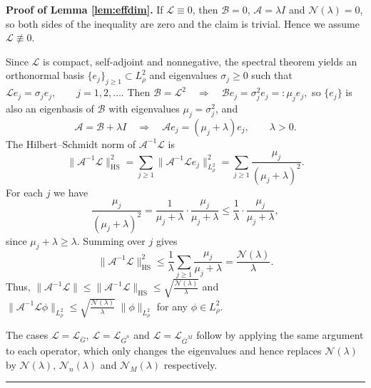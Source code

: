 \documentclass[12pt]{article}
\def\Gbar{ {\overline{G}} }
\newenvironment{proof}[1][Proof]{\noindent\textbf{#1.} }{\ \rule{0.5em}{0.5em}}
\numberwithin{equation}{section}
\numberwithin{theorem}{section}
\begin{document}
\begin{proof}[Proof of Lemma \ref{lem:effdim}]
If $\mathcal{L}\equiv 0$, then $\mathcal{B}=0$, $\mathcal{A}=\lambda I$ and $\mathcal{N}(\lambda)=0$, so both sides of the inequality are zero and the claim is trivial. Hence we assume $\mathcal{L}\not\equiv 0$.

Since $\mathcal{L}$ is compact, self-adjoint and nonnegative, the spectral theorem yields an orthonormal basis $\{e_j\}_{j\ge1}\subset L_\rho^2$ and eigenvalues $\sigma_j\ge0$ such that
$
\mathcal{L} e_j = \sigma_j e_j,\qquad j=1,2,\dots$. 
Then
$ 
\mathcal{B}=\mathcal{L}^2 \quad\Rightarrow\quad \mathcal{B}e_j=\sigma_j^2 e_j =:\mu_j e_j,
$
so $\{e_j\}$ is also an eigenbasis of $\mathcal{B}$ with eigenvalues $\mu_j=\sigma_j^2$, and
$$
\mathcal{A}=\mathcal{B}+\lambda I \quad\Rightarrow\quad \mathcal{A}e_j=(\mu_j+\lambda)e_j,\qquad \lambda>0.
$$
The Hilbert--Schmidt norm of $\mathcal{A}^{-1}\mathcal{L}$ is
$$
\|\mathcal{A}^{-1}\mathcal{L}\|_{\mathrm{HS}}^2
= \sum_{j\ge1}\|\mathcal{A}^{-1}\mathcal{L}e_j\|_{L_\rho^2}^2
= \sum_{j\ge1}\frac{\mu_j}{(\mu_j+\lambda)^2}.
$$
For each $j$ we have 
$$
\frac{\mu_j}{(\mu_j+\lambda)^2}
= \frac{1}{\mu_j+\lambda}\cdot\frac{\mu_j}{\mu_j+\lambda}
\le \frac{1}{\lambda}\cdot\frac{\mu_j}{\mu_j+\lambda},
$$
since $\mu_j+\lambda\ge\lambda$. Summing over $j$ gives
$$
\|\mathcal{A}^{-1}\mathcal{L}\|_{\mathrm{HS}}^2
\le \frac{1}{\lambda}\sum_{j\ge1}\frac{\mu_j}{\mu_j+\lambda}
= \frac{\mathcal{N}(\lambda)}{\lambda}.
$$
Thus, 
$
\|\mathcal{A}^{-1}\mathcal{L}\|
\le \|\mathcal{A}^{-1}\mathcal{L}\|_{\mathrm{HS}}
\le \sqrt{\frac{\mathcal{N}(\lambda)}{\lambda}}$ and 
$
\|\mathcal{A}^{-1}\mathcal{L}\phi\|_{L_\rho^2}
\le \sqrt{\frac{\mathcal{N}(\lambda)}{\lambda}}\;\|\phi\|_{L_\rho^2}$ for any $\phi\in L_\rho^2$.  

The cases $\mathcal{L}=\mathcal{L}_{\Gbar}$, $\mathcal{L}=\mathcal{L}_{\Gbar^n}$ and $\mathcal{L}=\mathcal{L}_{\Gbar^M}$ follow by applying the same argument to each operator, which only changes the eigenvalues and hence replaces $\mathcal{N}(\lambda)$ by $\mathcal{N}(\lambda)$, $\mathcal{N}_n(\lambda)$ and $\mathcal{N}_M(\lambda)$ respectively.
\end{proof}
\end{document}
